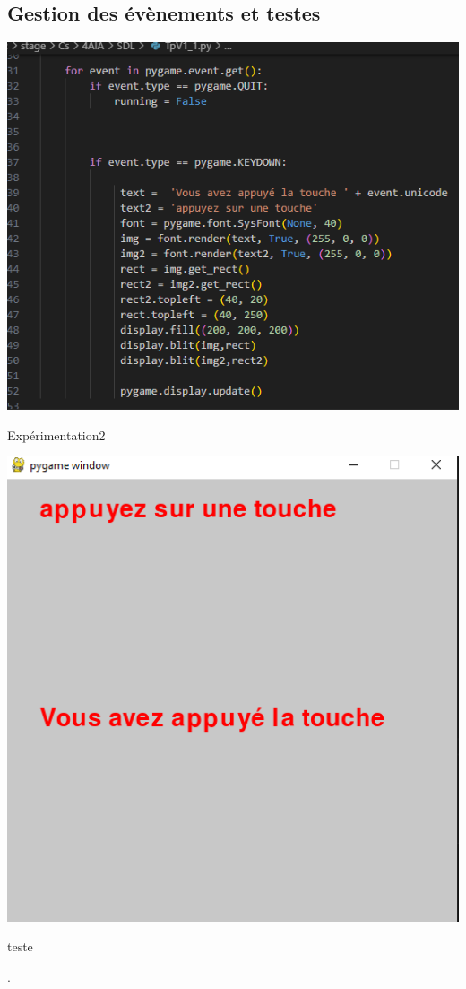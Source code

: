 \documentclass[12pt]{article}\usepackage{indentfirst}\usepackage[margin=2cm]{geometry}
\begin{document}
    \subsection{Gestion des évènements et testes}
    \begin{minipage}{0.49\textwidth}
    \centering
    \includegraphics[width=1\textwidth]{Images/4.png}
    \caption{Expérimentation2}
    \label{fig:1}
    \end{minipage}
    \hfill
    \begin{minipage}{0.49\textwidth}
    \centering
    \includegraphics[width=1\textwidth]{Images/5.png}
    \caption{teste}
    \label{fig:2}
    \end{minipage}.
    
	
\end{document}
